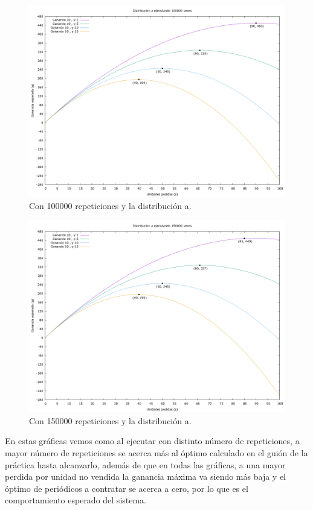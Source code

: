 \documentclass[12pt, spanish]{article}
\begin{document}
\begin{figure}[H]
	\centering
	\includegraphics[scale = 0.3]{prob_a/datos_a_100000.png}
	\caption{Con 100000 repeticiones y la distribución a.}
	\label{fig:ej1_a_100000}

\end{figure}

\begin{figure}[H]
	\centering
	\includegraphics[scale = 0.3]{prob_a/datos_a_150000.png}
	\caption{Con 150000 repeticiones y la distribución a.}
	\label{fig:ej1_a_150000}

\end{figure}

En estas gráficas vemos como al ejecutar con distinto número de repeticiones, a mayor número de repeticiones se acerca más al óptimo calculado en el guión de la práctica hasta alcanzarlo, además de que en todas las gráficas, a una mayor perdida por unidad no vendida la ganancia máxima va siendo más baja y el óptimo de periódicos a contratar se acerca a cero, por lo que es el comportamiento esperado del sistema.
\end{document}
